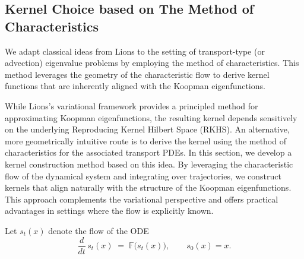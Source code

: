 \documentclass[11pt]{article}
\theoremstyle{plain}
\def\[{\begin{equation}}
\def\]{\end{equation}}
\begin{document}
\subsection{Kernel Choice based on The Method of Characteristics}  
\label{sec:char-method}


We adapt classical ideas from Lions to the setting of transport-type (or advection) eigenvalue problems by employing the method of characteristics. This method leverages the geometry of the characteristic flow to derive kernel functions that are inherently aligned with the Koopman eigenfunctions. 

While Lions’s variational framework provides a principled method for approximating Koopman eigenfunctions, the resulting kernel depends sensitively on  the underlying Reproducing Kernel Hilbert Space (RKHS). An alternative, more geometrically intuitive route is to derive the kernel using the method of characteristics for the associated transport PDEs. In this section, we develop a kernel construction method based on this idea. By leveraging the characteristic flow of the dynamical system and integrating over trajectories, we construct kernels that align naturally with the structure of the Koopman eigenfunctions. This approach complements the variational perspective and offers practical advantages in settings where the flow is explicitly known.

Let \(s_t(x)\) denote the flow of the ODE
\[
\frac{d}{dt}\,s_t(x) \;=\; {\mathbb{F}}\bigl(s_t(x)\bigr),
\qquad s_0(x)=x.
\]
\end{document}
